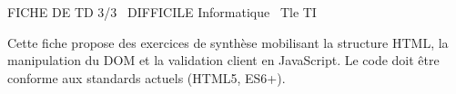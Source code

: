 \documentclass[11pt]{article}
\begin{document}
\begin{tcolorbox}[enhanced,colback=popink,colframe=popink,arc=10pt,boxrule=0pt,left=12pt,right=12pt,top=9pt,bottom=9pt]
{\color{white}\popxbold\small FICHE DE TD 3/3 \textbullet\ DIFFICILE \hfill Informatique \textbullet\ Tle TI\par}
\end{tcolorbox}
\vspace{4pt}
Cette fiche propose des exercices de synthèse mobilisant la structure HTML, la manipulation du DOM et la validation client en JavaScript. Le code doit être conforme aux standards actuels (HTML5, ES6+).
\end{document}
